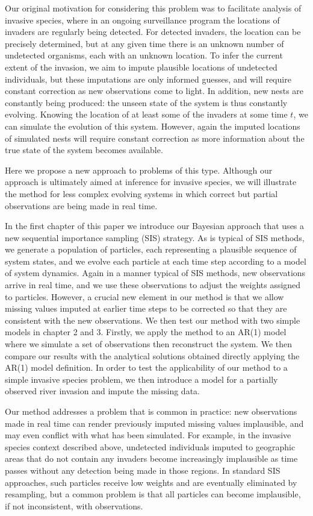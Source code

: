Our original motivation for considering this problem was to facilitate analysis of invasive species, where in an ongoing surveillance program the locations of invaders are regularly being detected. For detected invaders, the location can be precisely determined, but at any given time there is an unknown number of undetected organisms, each with an unknown location. To infer the current extent of the invasion, we aim to impute plausible locations of undetected individuals, but these imputations are only informed guesses, and will require constant correction as new observations come to light. In addition, new nests are constantly being produced: the unseen state of the system is thus constantly evolving. Knowing the location of at least some of the invaders at some time $t$, we can simulate the evolution of this system. However, again the imputed locations of simulated nests will require constant correction as more information about the true state of the system becomes available.

Here we propose a new approach to problems of this type. Although our approach is ultimately aimed at inference for invasive species, we will illustrate the method for less complex evolving systems in which correct but partial observations are being made in real time.

In the first chapter of this paper we introduce our Bayesian approach that uses a new sequential importance sampling (SIS) strategy. As is typical of SIS methods, we generate a population of particles, each representing a plausible sequence of system states, and we evolve each particle at each time step according to a model of system dynamics. Again in a manner typical of SIS methods, new observations arrive in real time, and we use these observations to adjust the weights assigned to particles. However, a crucial new element in our method is that we allow missing values imputed at earlier time steps to be corrected so that they are consistent with the new observations. We then test our method with two simple models in chapter 2 and 3. Firstly, we apply the method to an AR(1) model where we simulate a set of observations then reconstruct the system. We then compare our results with the analytical solutions obtained directly applying the AR(1) model definition. In order to test the applicability of our method to a simple invasive species problem, we then introduce a model for a partially observed river invasion and impute the missing data.

Our method addresses a problem that is common in practice: new observations made in real time can render previously imputed missing values implausible, and may even conflict with what has been simulated. For example, in the invasive species context described above, undetected individuals imputed to geographic areas that do not contain any invaders become increasingly implausible as time passes without any detection being made in those regions. In standard SIS approaches, such particles receive low weights and are eventually eliminated by resampling, but a common problem is that all particles can become implausible, if not inconsistent, with observations.

